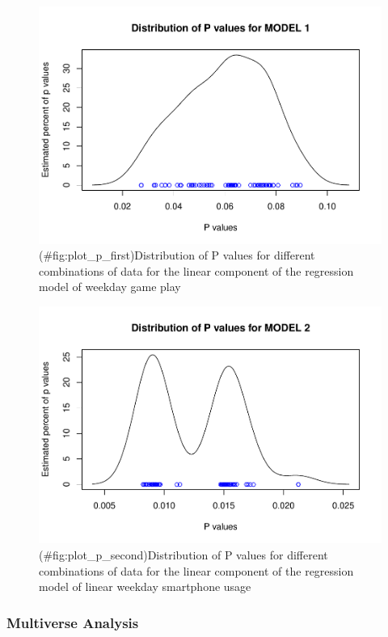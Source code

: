 \documentclass[floatsintext,man]{apa6}
\theoremstyle{definition}
\theoremstyle{definition}
\theoremstyle{definition}
\theoremstyle{remark}
\begin{document}
\begin{figure}
\centering
\includegraphics{stats_6_report_semifinal-3_files/figure-latex/plot_p_first-1.pdf}
\caption{(\#fig:plot\_p\_first)Distribution of P values for different
combinations of data for the linear component of the regression model of
weekday game play}
\end{figure}

\begin{figure}
\centering
\includegraphics{stats_6_report_semifinal-3_files/figure-latex/plot_p_second-1.pdf}
\caption{(\#fig:plot\_p\_second)Distribution of P values for different
combinations of data for the linear component of the regression model of
linear weekday smartphone usage}
\end{figure}

\hypertarget{multiverse-analysis}{%
\subsubsection{Multiverse Analysis}\label{multiverse-analysis}}
\end{document}

